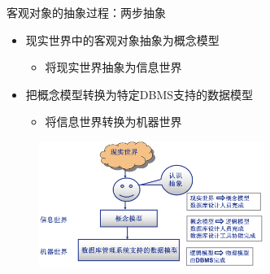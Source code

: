 客观对象的抽象过程：两步抽象
\begin{itemize}
    \item 现实世界中的客观对象抽象为概念模型
    \begin{itemize}
        \item 将现实世界抽象为信息世界
    \end{itemize}
    \item 把概念模型转换为特定DBMS支持的数据模型
    \begin{itemize}
        \item 将信息世界转换为机器世界
    \end{itemize}
\end{itemize}

\begin{figure}[H]
    \vspace{-0.5em}
	\centering
	\includegraphics[width=0.65\textwidth]{images/1.2}
    \vspace{-1em}
\end{figure}

